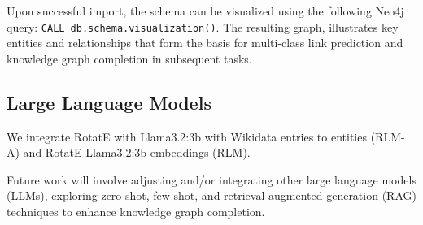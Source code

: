 Upon successful import, the schema can be visualized using the following Neo4j query: \texttt{CALL db.schema.visualization()}. The resulting graph, illustrates key entities and relationships that form the basis for multi-class link prediction and knowledge graph completion in subsequent tasks.

\subsection*{Large Language Models}

We integrate RotatE with Llama3.2:3b with Wikidata entries to entities (RLM-A) and RotatE Llama3.2:3b embeddings (RLM). 

Future work will involve adjusting and/or integrating other large language models (LLMs), exploring zero-shot, few-shot, and retrieval-augmented generation (RAG) techniques to enhance knowledge graph completion.
